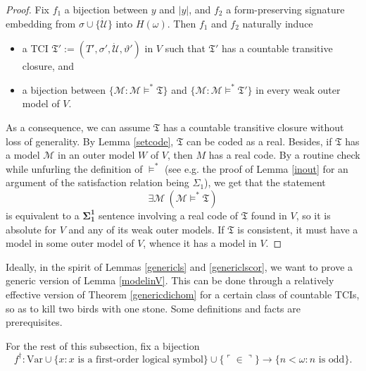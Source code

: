 \documentclass[12pt]{article}
\numberwithin{equation}{section}
\begin{document}
\begin{proof}
Fix $f_1$ a bijection between $y$ and $|y|$, and $f_2$ a form-preserving signature embedding from $\sigma \cup \{\dot{\mathcal{U}}\}$ into $H(\omega)$. Then $f_1$ and $f_2$ naturally induce
\begin{itemize}
    \item a TCI $\mathfrak{T}' := (T', \sigma', \dot{\mathcal{U}}, \vartheta')$ in $V$ such that $\mathfrak{T}'$ has a countable transitive closure, and
    \item a bijection between $\{\mathcal{M} : \mathcal{M} \models^* \mathfrak{T}\}$ and $\{\mathcal{M} : \mathcal{M} \models^* \mathfrak{T}'\}$ in every weak outer model of $V$.
\end{itemize}
As a consequence, we can assume $\mathfrak{T}$ has a countable transitive closure without loss of generality. By Lemma \ref{setcode}, $\mathfrak{T}$ can be coded as a real. Besides, if $\mathfrak{T}$ has a model $\mathcal{M}$ in an outer model $W$ of $V$, then $M$ has a real code. By a routine check while unfurling the definition of $\models^*$ (see e.g. the proof of Lemma \ref{inout} for an argument of the satisfaction relation being $\Sigma_1$), we get that the statement $$\exists \mathcal{M} \ (\mathcal{M} \models^* \mathfrak{T})$$ is equivalent to a $\mathbf{\Sigma^1_1}$ sentence involving a real code of $\mathfrak{T}$ found in $V$, so it is absolute for $V$ and any of its weak outer models. If $\mathfrak{T}$ is consistent, it must have a model in some outer model of $V$, whence it has a model in $V$.
\end{proof}

Ideally, in the spirit of Lemmas \ref{genericls} and \ref{genericlscor}, we want to prove a generic version of Lemma \ref{modelinV}. This can be done through a relatively effective version of Theorem \ref{genericdichom} for a certain class of countable TCIs, so as to kill two birds with one stone. Some definitions and facts are prerequisites.

For the rest of this subsection, fix a bijection $$f^{\dagger} : \mathrm{Var} \cup \{x : x \text{ is a first-order logical symbol}\} \cup \{\ulcorner \in \urcorner\} \longrightarrow \{n < \omega : n \text{ is odd}\}.$$
\end{document}
